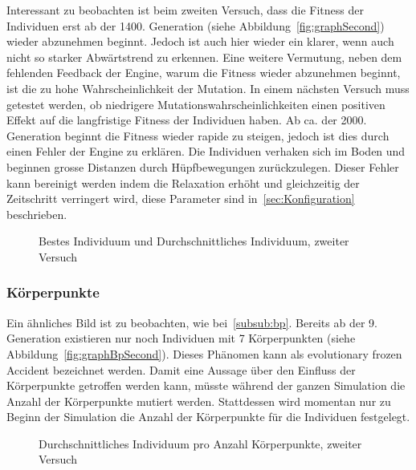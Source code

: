       Interessant zu beobachten ist beim zweiten Versuch,
      dass die Fitness der Individuen erst ab der 1400\@. Generation (siehe Abbildung~\vref{fig:graphSecond})
      wieder abzunehmen beginnt.
      Jedoch ist auch hier wieder ein klarer, wenn auch nicht so starker Abwärtstrend zu erkennen.
      Eine weitere Vermutung, neben dem fehlenden Feedback der Engine, warum die Fitness wieder abzunehmen beginnt,
      ist die zu hohe Wahrscheinlichkeit der Mutation.
      In einem nächsten Versuch muss getestet werden,
      ob niedrigere Mutationswahrscheinlichkeiten einen positiven Effekt auf die langfristige Fitness der Individuen haben.
      Ab ca\@. der 2000\@. Generation beginnt die Fitness wieder rapide zu steigen,
      jedoch ist dies durch einen Fehler der Engine zu erklären.
      Die Individuen verhaken sich im Boden und beginnen grosse Distanzen durch Hüpfbewegungen zurückzulegen.
      Dieser Fehler kann bereinigt werden indem die Relaxation erhöht und gleichzeitig der Zeitschritt verringert wird,
      diese Parameter sind in~\vref{sec:Konfiguration} beschrieben.

      \begin{figure}
        \centering
        
        \caption{Bestes Individuum und Durchschnittliches Individuum, zweiter Versuch\label{fig:graphSecond}}
      \end{figure}

      \subsubsection{Körperpunkte\label{subsub:bpScnd}}

        Ein ähnliches Bild ist zu beobachten, wie bei~\vref{subsub:bp}.
        Bereits ab der 9\@. Generation existieren nur noch Individuen mit 7 Körperpunkten (siehe Abbildung~\vref{fig:graphBpSecond}).
        Dieses Phänomen kann als evolutionary frozen Accident bezeichnet werden.
        Damit eine Aussage über den Einfluss der Körperpunkte getroffen werden kann,
        müsste während der ganzen Simulation die Anzahl der Körperpunkte mutiert werden.
        Stattdessen wird momentan nur zu Beginn der Simulation die Anzahl der Körperpunkte für die Individuen festgelegt.

        \begin{figure}
          \centering
          
          \caption{Durchschnittliches Individuum pro Anzahl Körperpunkte, zweiter Versuch\label{fig:graphBpSecond}}
        \end{figure}

